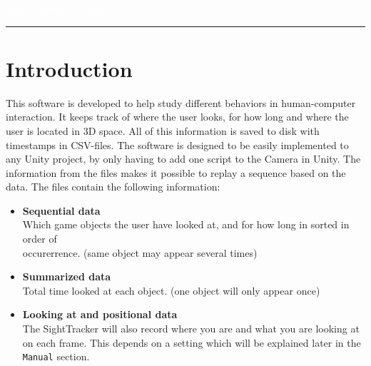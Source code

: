 \documentclass[letterpaper]{article}
\author{%
	\Large{\textbf{Group 3}}\\[0.15in]
    Halse, Douglas \\
    Karlsson, Mattias \\
    Larsson, Johan \\
    Persson, Hannes \\
    Östmo, Marcus \\
    }
\makeatletter
\def\printauthor{%
    {\large \@author}}
\makeatother
\begin{document}
\begin{titlepage}
\BgThispage
{}
\vspace*{2cm}
\noindent
\textcolor{white}{\bigsf Sight tracking in Unity}
\vspace*{2.5cm}\par
\noindent
\begin{minipage}{0.35\linewidth}
    \begin{flushright}
        \printauthor
    \end{flushright}
\end{minipage} \hspace{15pt}
%
\begin{minipage}{0.02\linewidth}
    \rule{1pt}{175pt}
\end{minipage} \hspace{-10pt}
%
\begin{minipage}{0.6\linewidth}
\vspace{-2in}
\end{minipage}
\end{titlepage}
\restoregeometry
\tableofcontents
\newpage
\section{Introduction}
This software is developed to help study different behaviors in human-computer interaction. It keeps track of where the user looks, for how long and where the user is located in 3D space. All of this information is saved to disk with timestamps in CSV-files. The software is designed to be easily implemented to any Unity project, by only having to add one script to the Camera in Unity. The information from the files makes it possible to replay a sequence based on the data.
The files contain the following information:
\begin{itemize}
\item \textbf{Sequential data}\\
Which game objects the user have looked at, and for how long in sorted in order of \\occurerrence. (same object may appear several times)
\item \textbf{Summarized data}\\
Total time looked at each object. (one object will only appear once)
\item \textbf{Looking at and positional data}\\
The SightTracker will also record where you are and what you are looking at on each frame. This depends on a setting which will be explained later in the \texttt{Manual} section.
\end{itemize}
\newpage
\end{document}
